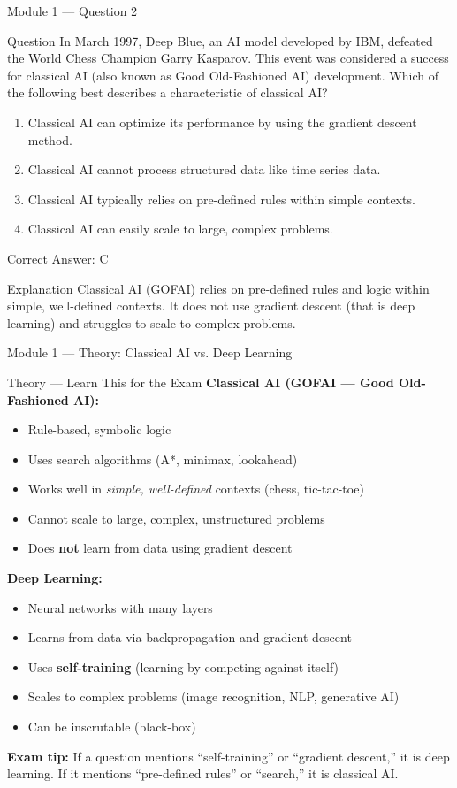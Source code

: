 \documentclass[aspectratio=169,10pt]{beamer}
\newcommand{\question}[1]{%
	\begin{block}{Question}
		#1
	\end{block}
}
\newcommand{\options}[4]{%
	\begin{enumerate}[label=\Alph*.,leftmargin=*]
		\item #1
		\item #2
		\item #3
		\item #4
	\end{enumerate}
}
\newcommand{\answerbox}[1]{%
	\begin{exampleblock}{Correct Answer: #1}
	\end{exampleblock}
}
\newcommand{\explain}[1]{%
	\begin{block}{Explanation}
		\small #1
	\end{block}
}
\newcommand{\theory}[1]{%
	\begin{block}{Theory --- Learn This for the Exam}
		\small #1
	\end{block}
}
\begin{document}
	\begin{frame}{Module 1 --- Question 2}
		\question{In March 1997, Deep Blue, an AI model developed by IBM, defeated the World Chess Champion Garry Kasparov. This event was considered a success for classical AI (also known as Good Old-Fashioned AI) development. Which of the following best describes a characteristic of classical AI?}
		\options{Classical AI can optimize its performance by using the gradient descent method.}{Classical AI cannot process structured data like time series data.}{Classical AI typically relies on pre-defined rules within simple contexts.}{Classical AI can easily scale to large, complex problems.}
		\answerbox{C}
		\explain{Classical AI (GOFAI) relies on pre-defined rules and logic within simple, well-defined contexts. It does not use gradient descent (that is deep learning) and struggles to scale to complex problems.}
	\end{frame}
	
	\begin{frame}{Module 1 --- Theory: Classical AI vs. Deep Learning}
		\theory{
			\textbf{Classical AI (GOFAI --- Good Old-Fashioned AI):}
			\begin{itemize}
				\item Rule-based, symbolic logic
				\item Uses search algorithms (A*, minimax, lookahead)
				\item Works well in \emph{simple, well-defined} contexts (chess, tic-tac-toe)
				\item Cannot scale to large, complex, unstructured problems
				\item Does \textbf{not} learn from data using gradient descent
			\end{itemize}
			\textbf{Deep Learning:}
			\begin{itemize}
				\item Neural networks with many layers
				\item Learns from data via backpropagation and gradient descent
				\item Uses \textbf{self-training} (learning by competing against itself)
				\item Scales to complex problems (image recognition, NLP, generative AI)
				\item Can be inscrutable (black-box)
			\end{itemize}
			\textbf{Exam tip:} If a question mentions ``self-training'' or ``gradient descent,'' it is deep learning. If it mentions ``pre-defined rules'' or ``search,'' it is classical AI.
		}
	\end{frame}
	
\end{document}
